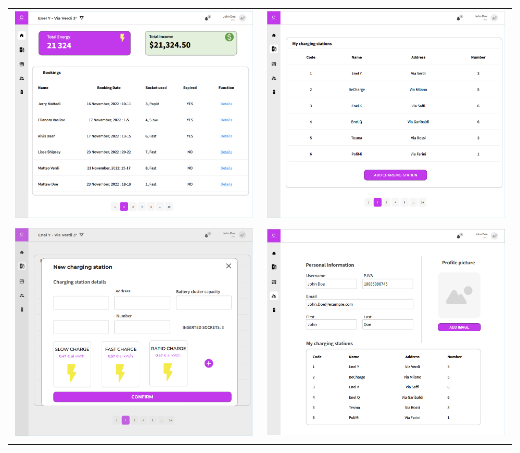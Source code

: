 \begin{table}[H]
\centering
\begin{tabu}to \textwidth {X[c]X[c]}
  \includegraphics[width=70mm]{images/home2.png}\label{fig:homePageCPO} &
  \includegraphics[width=70mm]{images/add.png}\label{fig:chargingStation} \\
  \includegraphics[width=70mm]{images/add2.png}\label{fig:addChargingStation} &
  \includegraphics[width=70mm]{images/cpo.png}\label{fig:personalInformationCPO} \\
\end{tabu}
\end{table}
